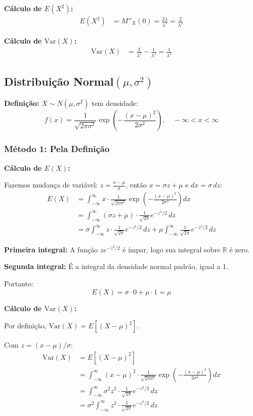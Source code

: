 \documentclass[12pt,a4paper]{article}
\theoremstyle{plain}
\theoremstyle{definition}
\theoremstyle{remark}
\begin{document}
\textbf{Cálculo de \(E(X^2)\):}
\begin{align}
E(X^2) &= M''_X(0) = \frac{2\lambda}{\lambda^3} = \frac{2}{\lambda^2}
\end{align}

\textbf{Cálculo de \(\text{Var}(X)\):}
\begin{align}
\text{Var}(X) &= \frac{2}{\lambda^2} - \frac{1}{\lambda^2} = \frac{1}{\lambda^2}
\end{align}

\subsection{Distribuição Normal\((\mu, \sigma^2)\)}

\textbf{Definição:} \(X \sim N(\mu, \sigma^2)\) tem densidade:
\[
f(x) = \frac{1}{\sqrt{2\pi\sigma^2}} \exp\left(-\frac{(x-\mu)^2}{2\sigma^2}\right), \quad -\infty < x < \infty
\]

\subsubsection{Método 1: Pela Definição}

\textbf{Cálculo de \(E(X)\):}

Fazemos mudança de variável: \(z = \frac{x-\mu}{\sigma}\), então \(x = \sigma z + \mu\) e \(dx = \sigma \, dz\):
\begin{align}
E(X) &= \int_{-\infty}^{\infty} x \cdot \frac{1}{\sqrt{2\pi\sigma^2}} \exp\left(-\frac{(x-\mu)^2}{2\sigma^2}\right) dx \\
&= \int_{-\infty}^{\infty} (\sigma z + \mu) \cdot \frac{1}{\sqrt{2\pi}} e^{-z^2/2} \, dz \\
&= \sigma \int_{-\infty}^{\infty} z \cdot \frac{1}{\sqrt{2\pi}} e^{-z^2/2} \, dz + \mu \int_{-\infty}^{\infty} \frac{1}{\sqrt{2\pi}} e^{-z^2/2} \, dz
\end{align}

\textbf{Primeira integral:} A função \(z e^{-z^2/2}\) é ímpar, logo sua integral sobre \(\mathbb{R}\) é zero.

\textbf{Segunda integral:} É a integral da densidade normal padrão, igual a 1.

Portanto:
\[
E(X) = \sigma \cdot 0 + \mu \cdot 1 = \mu
\]

\textbf{Cálculo de \(\text{Var}(X)\):}

Por definição, \(\text{Var}(X) = E[(X-\mu)^2]\).

Com \(z = (x-\mu)/\sigma\):
\begin{align}
\text{Var}(X) &= E[(X-\mu)^2] \\
&= \int_{-\infty}^{\infty} (x-\mu)^2 \cdot \frac{1}{\sqrt{2\pi\sigma^2}} \exp\left(-\frac{(x-\mu)^2}{2\sigma^2}\right) dx \\
&= \int_{-\infty}^{\infty} \sigma^2 z^2 \cdot \frac{1}{\sqrt{2\pi}} e^{-z^2/2} \, dz \\
&= \sigma^2 \int_{-\infty}^{\infty} z^2 \cdot \frac{1}{\sqrt{2\pi}} e^{-z^2/2} \, dz
\end{align}
\end{document}
